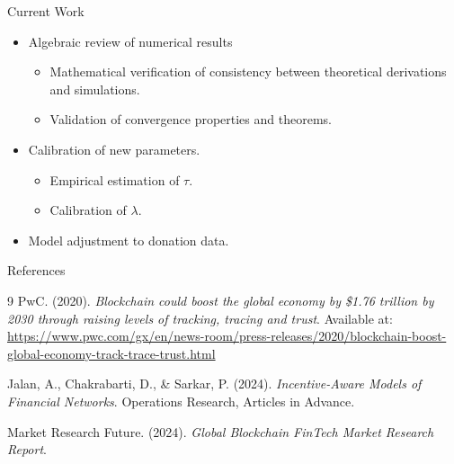 \documentclass{beamer}
\begin{document}
\begin{frame}{Current Work}
\begin{itemize}
\item Algebraic review of numerical results
    \begin{itemize}
        \item Mathematical verification of consistency between theoretical derivations and simulations.
        \item Validation of convergence properties and theorems.
    \end{itemize}
\item Calibration of new parameters.
    \begin{itemize}
        \item Empirical estimation of $\tau$.
        \item Calibration of $\lambda$.
    \end{itemize}
\item Model adjustment to donation data.
\end{itemize}
\end{frame}

\begin{frame}[allowframebreaks]{References}
\begin{thebibliography}{9}
PwC. (2020). 
\textit{Blockchain could boost the global economy by \$1.76 trillion by 2030 through raising levels of tracking, tracing and trust}. 
Available at: \url{https://www.pwc.com/gx/en/news-room/press-releases/2020/blockchain-boost-global-economy-track-trace-trust.html}

Jalan, A., Chakrabarti, D., \& Sarkar, P. (2024). 
\textit{Incentive-Aware Models of Financial Networks}. 
Operations Research, Articles in Advance.

Market Research Future. (2024). 
\textit{Global Blockchain FinTech Market Research Report}.
\end{thebibliography}
\end{frame}
\end{document}
